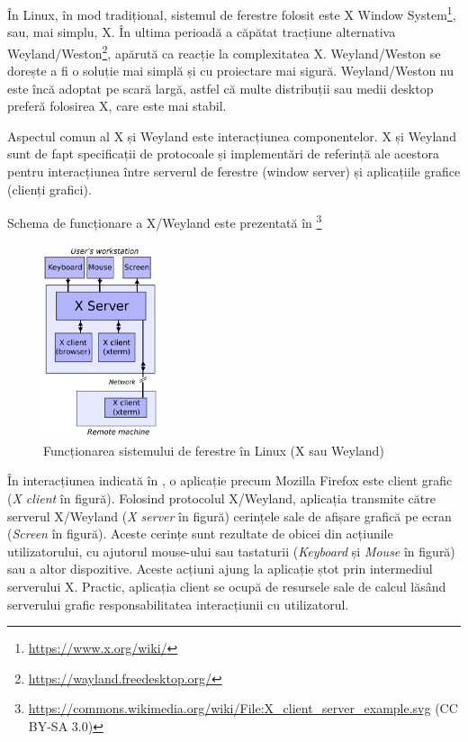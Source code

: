 În Linux, în mod tradițional, sistemul de ferestre folosit este X Window System\footnote{\url{https://www.x.org/wiki/}}, sau, mai simplu, X. În ultima perioadă a căpătat tracțiune alternativa Weyland/Weston\footnote{\url{https://wayland.freedesktop.org/}}, apărută ca reacție la complexitatea X. Weyland/Weston se dorește a fi o soluție mai simplă și cu proiectare mai sigură. Weyland/Weston nu este încă adoptat pe scară largă, astfel că multe distribuții sau medii desktop preferă folosirea X, care este mai stabil.

Aspectul comun al X și Weyland este interacțiunea componentelor. X și Weyland sunt de fapt specificații de protocoale și implementări de referință ale acestora pentru interacțiunea între serverul de ferestre (window server) și aplicațiile grafice (clienți grafici).

Schema de funcționare a X/Weyland este prezentată în \footnote{\url{https://commons.wikimedia.org/wiki/File:X_client_server_example.svg} (CC BY-SA 3.0)}

\begin{figure}[htbp]
  \centering
  \includegraphics[width=0.3\textwidth]{chapters/01-ui/img/x-window-system.pdf}
  \caption{Funcționarea sistemului de ferestre în Linux (X sau Weyland)}
  \label{fig:ui:x-window-system}
\end{figure}

În interacțiunea indicată în , o aplicație precum Mozilla Firefox este client grafic (\textit{X client} în figură). Folosind protocolul X/Weyland, aplicația transmite către serverul X/Weyland (\textit{X server} în figură) cerințele sale de afișare grafică pe ecran (\textit{Screen} în figură). Aceste cerințe sunt rezultate de obicei din acțiunile utilizatorului, cu ajutorul mouse-ului sau tastaturii (\textit{Keyboard} și \textit{Mouse} în figură) sau a altor dispozitive. Aceste acțiuni ajung la aplicație ștot prin intermediul serverului X. Practic, aplicația client se ocupă de resursele sale de calcul lăsând serverului grafic responsabilitatea interacțiunii cu utilizatorul.

